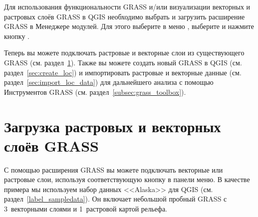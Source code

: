 Для использования функциональности GRASS и/или визуализации векторных
и растровых слоёв GRASS в QGIS необходимо выбрать и загрузить расширение
GRASS в Менеджере модулей. Для этого выберите в меню
 \arrow {}, выберите
 и нажмите кнопку .

Теперь вы можете подключать растровые и векторные слои из существующего
 GRASS (см. раздел~\ref{sec:load_grassdata}). Также
вы можете создать новый  GRASS в QGIS (см.
раздел~\ref{sec:create_loc}) и импортировать растровые и векторные
данные (см. раздел~\ref{sec:import_loc_data}) для дальнейшего анализа
с помощью Инструментов GRASS (см. раздел~\ref{subsec:grass_toolbox}).

\section{Загрузка растровых и векторных слоёв GRASS}\label{sec:load_grassdata}

С помощью расширения GRASS вы можете подключать векторные или растровые
слои, используя соответствующую кнопку в панели меню. В качестве примера
мы используем набор данных <<Alaska>> для QGIS (см. раздел~\ref{label_sampledata}).
Он включает небольшой пробный  GRASS с 3~векторными
слоями и 1~растровой картой рельефа.

